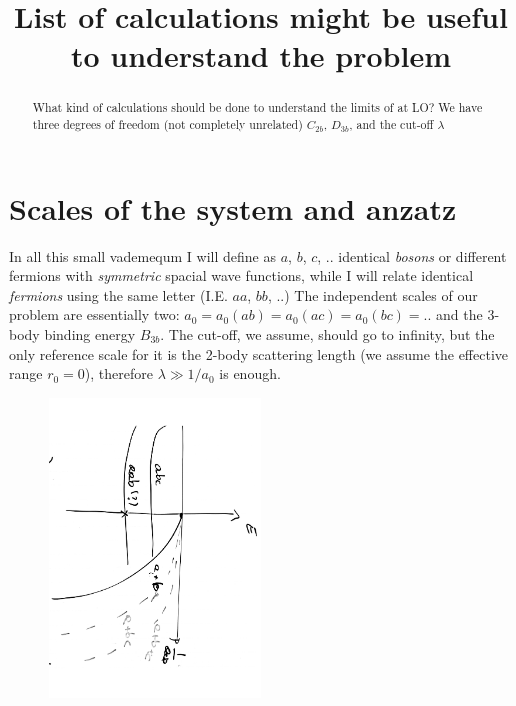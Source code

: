 \documentclass[aps,prd
,tightenlines,letterpaper,
nofootinbib]{revtex4-1}
\begin{document}
 
\title{
List of calculations might be useful to understand the problem
} 

\begin{abstract}
What kind of calculations should be done to understand the limits of \eftnopi at LO? 
We have three degrees of freedom (not completely unrelated) $C_{2b}$, $D_{3b}$, and the cut-off $\lambda$
\end{abstract}

\pacs{}
 
\maketitle


\section{Scales of the system and anzatz}
In all this small vademequm I will define as $a$, $b$, $c$, .. identical \textit{bosons} or different fermions with \textit{symmetric} spacial wave functions, while I will relate identical \textit{fermions} using the same letter (I.E. $aa$, $bb$, ..)
The independent scales of our problem are essentially two: $a_0=a_0(ab)=a_0(ac)=a_0(bc)=..$ and the 3-body binding energy $B_{3b}$.
The cut-off, we assume, should go to infinity, but the only reference scale for it is the 2-body scattering length (we assume the effective range $r_0=0$), therefore $\lambda \gg 1/a_{0}$ is enough.

\begin{figure}[h] 
\centering 
\includegraphics[width=0.5\textwidth,angle=90]{./efimovaab.pdf} 
\label{fig:ef_plot}
\caption{} 
\end{figure} 
\end{document}
